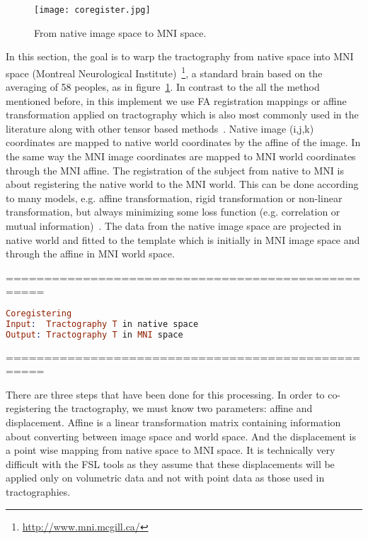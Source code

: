 \begin{figure}
  \centering
  \texttt{[image: coregister.jpg]}
  \caption{From native image space to MNI space.}
  \label{Fig:coregister}
\end{figure}

In this section, the goal is to warp the tractography from native space into MNI space (Montreal Neurological Institute)~\footnote{\url{http://www.mni.mcgill.ca/}}, a standard brain based on the averaging of 58 peoples, as in figure~\ref{Fig:coregister}. In contrast to the all the method mentioned before, in this implement we use FA registration mappings or affine transformation applied on tractography which is also most commonly used in the literature along with other tensor based methods~\cite{goh2006algebraic}. Native image (i,j,k) coordinates are mapped to native world coordinates by the affine of the image. In the same way the MNI image coordinates are mapped to MNI world coordinates through the MNI affine. The registration of the subject from native to MNI is about registering the native world to the MNI world. This can be done according to many models, e.g. affine transformation, rigid transformation or non-linear transformation, but always minimizing some loss function (e.g. correlation or mutual information)~\cite{zhu2002influence}. The data from the native image space are projected in native world and fitted to the template which is initially in MNI image space and through the affine in MNI world space.
\begin{center}===================================================\end{center}
\begin{lstlisting}[language=Prolog]
Coregistering
Input:  Tractography T in native space
Output: Tractography T in MNI space	
\end{lstlisting}
\begin{center}===================================================\end{center}
There are three steps that have been done for this processing. In order to co-registering the tractography, we must know two parameters: affine and displacement. Affine is a linear transformation matrix containing information about converting between image space and world space. And the displacement is a point wise mapping from native space to MNI space. It is technically very difficult with the FSL tools as they assume that these displacements will be applied only on volumetric data and not with point data as those used in tractographies. 
 
